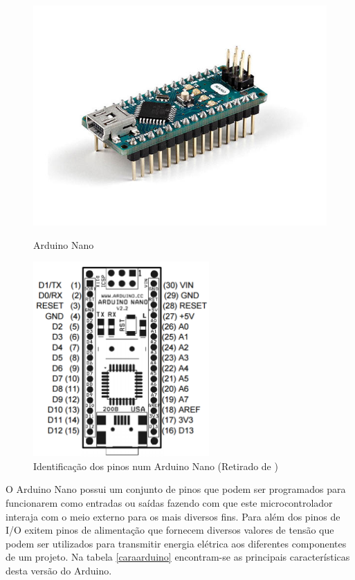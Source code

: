 \begin{figure}[h]
	\centering
	\begin{minipage}[b]{0.49\textwidth}
		\centering
		\includegraphics[width=\textwidth]{img/hardware/nano-img.jpg}
		\caption{Arduino Nano}
		\label{ard2}
	\end{minipage}
	\hfill
	\begin{minipage}[b]{0.49\textwidth}
		\centering
		\includegraphics[width=0.6\textwidth]{img/hardware/nano-esquema.png}
		\caption[Identificação dos pinos num Arduino Nano]{Identificação dos pinos num Arduino Nano (Retirado de \cite{arduinonanouser})}
		\label{ard1}
	\end{minipage}
\end{figure}



O Arduino Nano possui um conjunto de pinos que podem ser programados para funcionarem como entradas ou saídas fazendo com que este  microcontrolador interaja com o meio externo para os mais diversos fins. Para além dos pinos de \ac{I/O} exitem pinos de alimentação que fornecem diversos valores de tensão que podem ser utilizados para transmitir energia elétrica aos diferentes componentes de um projeto\cite{Banzi2012}. Na tabela \ref{caraarduino} encontram-se as principais características desta versão do Arduino. 




